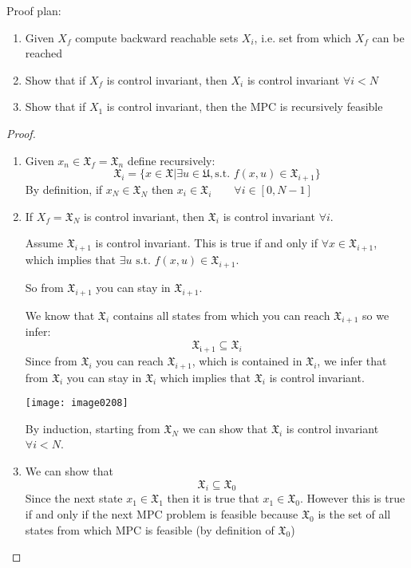 Proof plan:
\begin{enumerate}
\item Given $X_f$ compute backward reachable sets $X_i$, i.e. set from which $X_f$ can be reached
\item Show that if $X_f$ is control invariant, then $X_i$ is control invariant $\forall i < N$
\item Show that if $X_1$ is control invariant, then the MPC is recursively feasible
\end{enumerate}
\begin{proof}
\begin{enumerate}
\item Given $x_n \in \mathfrak{X}_f = \mathfrak{X}_n$ define  recursively:
\[\mathfrak{X}_i = \{x\in\mathfrak{X}|\exists u\in\mathfrak{U}, \text{s.t. } f(x,u)\in\mathfrak{X}_{i+1}\}\]
By definition, if $x_N  \in \mathfrak{X}_N$ then $x_i\in\mathfrak{X}_i\qquad\forall i \in[0,N-1]$
\item If $X_f = \mathfrak{X}_N$ is control invariant, then $\mathfrak{X}_i$ is control invariant $\forall i$.

Assume $\mathfrak{X}_{i+1}$ is control invariant. This is true if and only if $\forall x \in \mathfrak{X}_{i+1}$, which implies that $\exists u \text{ s.t. } f(x,u)\in \mathfrak{X}_{i+1}$.

\begin{minipage}{.625\textwidth}
So from $\mathfrak{X}_{i+1}$ you can stay in $\mathfrak{X}_{i+1}$.

We know that $\mathfrak{X}_i$ contains all states from which you can reach $\mathfrak{X}_{i+1}$ so we infer:
\[\mathfrak{X_{i+1}}\subseteq \mathfrak{X}_i\]
Since from $\mathfrak{X}_i$ you can reach $\mathfrak{X}_{i+1}$, which is contained in $\mathfrak{X}_i$, we infer that from $\mathfrak{X}_i$ you can stay in $\mathfrak{X}_i$ which implies that $\mathfrak{X}_i$ is control  invariant.
\end{minipage}
\hfill
\begin{minipage}{.35\textwidth}
\centering
\texttt{[image: image0208]}
\end{minipage}

By induction, starting from $\mathfrak{X}_N$ we can show that $\mathfrak{X}_i$ is control invariant $\forall i <N$.
\item We can show that 
\[\mathfrak{X}_i \subseteq \mathfrak{X}_0\]
Since the next state $x_1\in\mathfrak{X}_1$  then it is true that $x_1\in\mathfrak{X}_0$. However this is true if and only if the next MPC problem is feasible because $\mathfrak{X}_0$ is the set of all states from which MPC is feasible (by definition of $\mathfrak{X}_0$)
\end{enumerate}
\end{proof}
 
